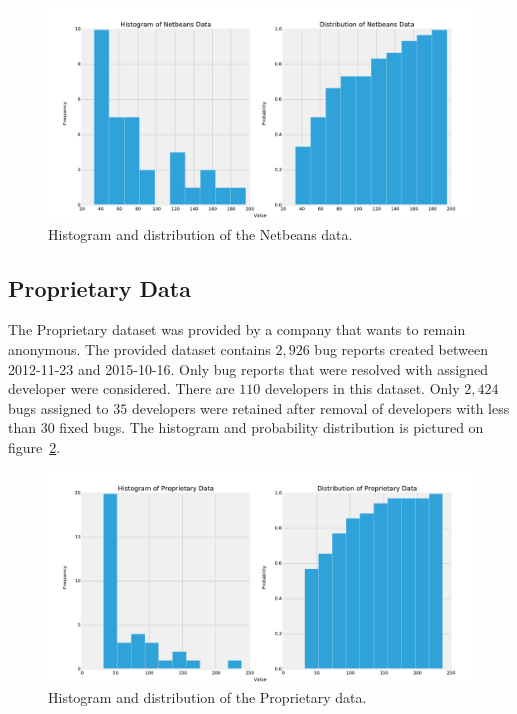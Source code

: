 \begin{figure}[htbp]
    \centering
        \includegraphics[width=\textwidth]{./images/distribution/netbeans.pdf}
    \caption{Histogram and distribution of the Netbeans data.}
    \label{fig:datasets.netbeans.dist}
\end{figure}

\subsection{Proprietary Data}

The Proprietary dataset was provided by a company that wants to remain anonymous. The provided dataset contains $2,926$ bug reports created between 2012-11-23 and 2015-10-16. Only bug reports that were resolved with assigned developer were considered. There are $110$ developers in this dataset. Only $2,424$ bugs assigned to $35$ developers were retained after removal of developers with less than $30$ fixed bugs. The histogram and probability distribution is pictured on figure~\ref{fig:datasets.proprietary.dist}.

\begin{figure}[htbp]
    \centering
        \includegraphics[width=\textwidth]{./images/distribution/proprietary.pdf}
    \caption{Histogram and distribution of the Proprietary data.}
    \label{fig:datasets.proprietary.dist}
\end{figure}

